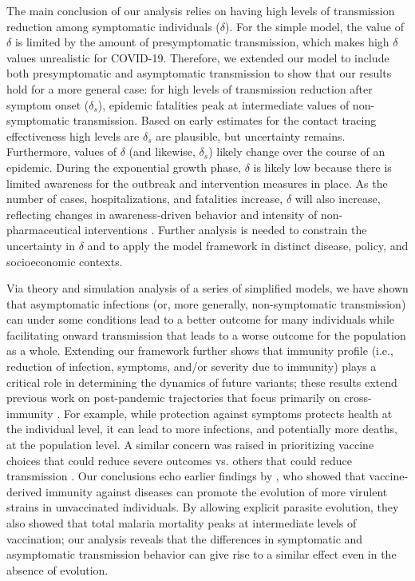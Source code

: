 \documentclass[12pt]{article}
\begin{document}
The main conclusion of our analysis relies on having high levels of transmission reduction among symptomatic individuals ($\delta$). 
For the simple model, the value of $\delta$ is limited by the amount of presymptomatic transmission, which makes high $\delta$ values unrealistic for COVID-19.
Therefore, we extended our model to include both presymptomatic and asymptomatic transmission to show that our results hold for a more general case: for high levels of transmission reduction after symptom onset ($\delta_s$), epidemic fatalities peak at intermediate values of non-symptomatic transmission.
Based on early estimates for the contact tracing effectiveness \citep{kucharski2020effectiveness} high levels are $\delta_s$ are plausible, but uncertainty remains. 
Furthermore, values of $\delta$ (and likewise, $\delta_s$) likely change over the course of an epidemic.
During the exponential growth phase, $\delta$ is likely low because there is limited awareness for the outbreak and intervention measures in place.
As the number of cases, hospitalizations, and fatalities increase, $\delta$ will also increase, reflecting changes in awareness-driven behavior and intensity of non-pharmaceutical interventions \citep{weitz2020awareness}.
Further analysis is needed to constrain the uncertainty in $\delta$ and to apply the model framework in distinct disease, policy, and socioeconomic contexts. 

Via theory and simulation analysis of a series of simplified models, we have shown that asymptomatic infections (or, more generally, non-symptomatic transmission) can under some conditions lead to a better outcome for many individuals while facilitating onward transmission that leads to a worse outcome for the population as a whole.
Extending our framework further shows that immunity profile (i.e., reduction of infection, symptoms, and/or severity due to immunity) plays a critical role in determining the dynamics of future variants;
these results extend previous work on post-pandemic trajectories that focus primarily on cross-immunity \cite{kissler2020projecting,lavine2021immunological}.
For example, while protection against symptoms protects health at the individual level, it can lead to more infections, and potentially more deaths, at the population level.
A similar concern was raised in prioritizing vaccine choices that could reduce severe outcomes vs. others that could reduce transmission \cite{koelle2022changing}.
Our conclusions echo earlier findings by \cite{gandon2001imperfect}, who showed that vaccine-derived immunity against diseases can promote the evolution of more virulent strains in unvaccinated individuals.
By allowing explicit parasite evolution, they also showed that total malaria mortality peaks at intermediate levels of vaccination; our analysis reveals that the differences in symptomatic and asymptomatic transmission behavior can give rise to a similar effect even in the absence of evolution.  
\end{document}
